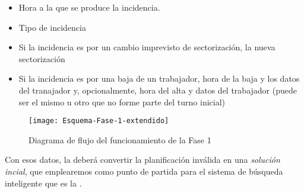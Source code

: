 \begin{itemize}
	\item Hora a la que se produce la incidencia.
	\item Tipo de incidencia
	\item Si la incidencia es por un cambio imprevisto de sectorización, la nueva sectorización
	\item Si la incidencia es por una baja de un trabajador, hora de la baja y los datos del tranajador y, 
	opcionalmente, hora del alta y datos del trabajador (puede ser el mismo u otro que no forme parte del turno inicial)
\end{itemize}

\begin{figure}[htbp]
	\centering
	\texttt{[image: Esquema-Fase-1-extendido]}
	\caption{Diagrama de flujo del funcionamiento de la Fase 1}
	\label{fig:3:esquema-fase-1}
\end{figure}

Con esos datos, la \faseuno deberá convertir la planificación inválida en una \textit{solución incial}, que emplearemos 
como punto de partida para el sistema de búsqueda inteligente que es la \fasedos{}.














